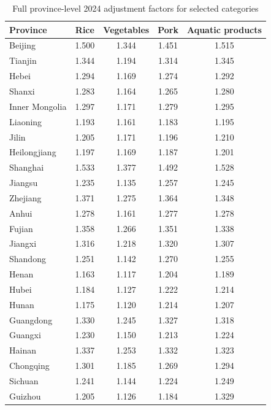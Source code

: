 \documentclass[preprint,12pt,authoryear]{elsarticle}
\begin{document}
\begin{table}[htbp]
\centering
\begin{threeparttable}
\caption{Full province-level 2024 adjustment factors for selected categories}
\label{tab:prov2024_full}
\small
\setlength{\tabcolsep}{0pt}
\begin{tabular*}{\textwidth}{@{\extracolsep{\fill}} l cccc @{}}
\toprule
Province & Rice & Vegetables & Pork & Aquatic products \\
\midrule
Beijing       & 1.500 & 1.344 & 1.451 & 1.515 \\
Tianjin       & 1.344 & 1.194 & 1.314 & 1.345 \\
Hebei         & 1.294 & 1.169 & 1.274 & 1.292 \\
Shanxi        & 1.283 & 1.164 & 1.265 & 1.280 \\
Inner Mongolia & 1.297 & 1.171 & 1.279 & 1.295 \\
Liaoning      & 1.193 & 1.161 & 1.183 & 1.195 \\
Jilin         & 1.205 & 1.171 & 1.196 & 1.210 \\
Heilongjiang  & 1.197 & 1.169 & 1.187 & 1.201 \\
Shanghai      & 1.533 & 1.377 & 1.492 & 1.528 \\
Jiangsu       & 1.235 & 1.135 & 1.257 & 1.245 \\
Zhejiang      & 1.371 & 1.275 & 1.364 & 1.348 \\
Anhui         & 1.278 & 1.161 & 1.277 & 1.278 \\
Fujian        & 1.358 & 1.266 & 1.351 & 1.338 \\
Jiangxi       & 1.316 & 1.218 & 1.320 & 1.307 \\
Shandong      & 1.251 & 1.142 & 1.270 & 1.255 \\
Henan         & 1.163 & 1.117 & 1.204 & 1.189 \\
Hubei         & 1.184 & 1.127 & 1.222 & 1.214 \\
Hunan         & 1.175 & 1.120 & 1.214 & 1.207 \\
Guangdong     & 1.330 & 1.245 & 1.327 & 1.318 \\
Guangxi       & 1.230 & 1.150 & 1.213 & 1.224 \\
Hainan        & 1.337 & 1.253 & 1.332 & 1.323 \\
Chongqing     & 1.301 & 1.185 & 1.269 & 1.294 \\
Sichuan       & 1.241 & 1.144 & 1.224 & 1.249 \\
Guizhou       & 1.205 & 1.126 & 1.184 & 1.329 \\

\end{tabular*}
\end{threeparttable}
\end{table}
\end{document}
